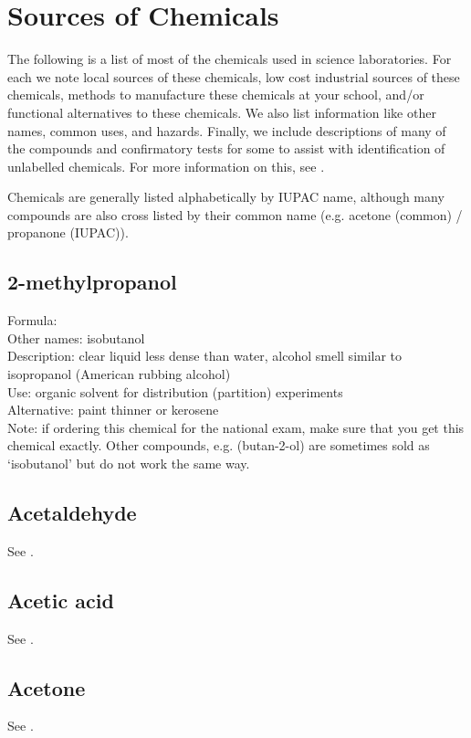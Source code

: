 \chapter{Sources of Chemicals}
\label{cha:sourcesofchemicals}
The following is a list of most of the chemicals 
used in science laboratories. 
For each we note local sources of these chemicals, 
low cost industrial sources of these chemicals, 
methods to manufacture these chemicals at your school, 
and/or functional alternatives to these chemicals. 
We also list information like other names, 
common uses, 
and hazards. 
Finally, 
we include descriptions of many of the compounds 
and confirmatory tests for some to assist 
with identification of unlabelled chemicals. 
For more information on this, 
see .

Chemicals are generally listed alphabetically by IUPAC name, 
although many compounds are also cross listed by their common name (e.g. 
acetone (common) / propanone (IUPAC)).

\section{2-methylpropanol}
\label{sec:methylpropanol}
Formula: \\
Other names: isobutanol\\
Description: clear liquid less dense than water, 
alcohol smell similar to isopropanol (American rubbing alcohol)\\
Use: organic solvent for distribution (partition) experiments\\
Alternative: paint thinner or kerosene\\
Note: if ordering this chemical for the national exam, 
make sure that you get this chemical exactly. 
Other compounds, 
e.g. 
 (butan-2-ol) are sometimes sold 
as ‘isobutanol’ but do not work the same way.

\section{Acetaldehyde}
See .

\section{Acetic acid}
See .

\section{Acetone}
See .

